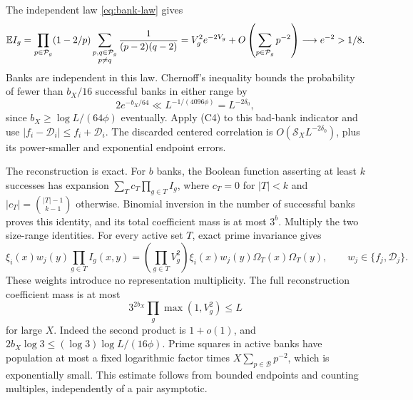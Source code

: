 The independent law \eqref{eq:bank-law} gives
\begin{equation}\label{eq:success}
 \mathbb E I_g=\prod_{p\in\mathcal P_g}(1-2/p)
 \sum_{\substack{p,q\in\mathcal P_g\\p\ne q}}
                  \frac1{(p-2)(q-2)}
 =V_g^2e^{-2V_g}+O\left(\sum_{p\in\mathcal P_g}p^{-2}\right)
 \longrightarrow e^{-2}>1/8.
\end{equation}
Banks are independent in this law. Chernoff's inequality bounds the
probability of fewer than \(b_X/16\) successful banks in either range by
\begin{equation}\label{eq:rare-budget}
 2e^{-b_X/64}\ll L^{-1/(4096\phi)}=L^{-2\delta_0},
\end{equation}
since \(b_X\ge\log L/(64\phi)\) eventually. Apply (C4) to this
bad-bank indicator and use \(|f_i-\mathcal D_i|\le f_i+\mathcal D_i\).
The discarded centered correlation is
\(O(\mathcal S_XL^{-2\delta_0})\), plus its power-smaller
and exponential endpoint errors.

The reconstruction is exact. For \(b\) banks, the Boolean function
asserting at least \(k\) successes has expansion
\(\sum_Tc_T\prod_{g\in T}I_g\), where \(c_T=0\) for \(|T|<k\)
and \(|c_T|=\binom{|T|-1}{k-1}\) otherwise. Binomial inversion in
the number of successful banks proves this identity, and its total
coefficient mass is at most \(3^b\). Multiply the two size-range
identities. For every active set \(T\), exact prime invariance gives
\begin{equation}\label{eq:reconstruction}
 \xi_i(x)w_j(y)\prod_{g\in T}I_g(x,y)
 =\left(\prod_{g\in T}V_g^2\right)
                  \xi_i(x)w_j(y)\Omega_T(x)\Omega_T(y),
 \qquad w_j\in\{f_j,\mathcal D_j\}.
\end{equation}
These weights introduce no representation multiplicity.
The full reconstruction coefficient mass is at most
\[
 3^{2b_X}\prod_g\max(1,V_g^2)\le L
\]
for large \(X\). Indeed the second product is \(1+o(1)\), and
\(2b_X\log3\le(\log3)\log L/(16\phi)\).
Prime squares in active banks have population at most a fixed
logarithmic factor times \(X\sum_{p\in\mathcal B}p^{-2}\),
which is exponentially small. This estimate follows from bounded
endpoints and counting multiples, independently of a pair asymptotic.

